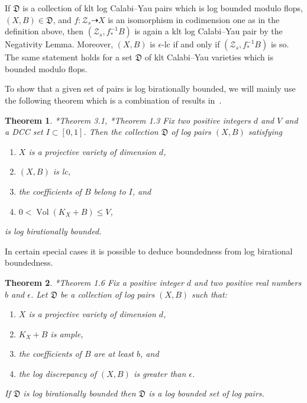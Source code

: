 \documentclass[11pt]{ip-journal}
\newtheorem{theorem}{Theorem}[section]
\theoremstyle{definition}
\DeclareMathOperator{\Vol}{\mathrm{Vol}}
\begin{document}
If $\mathfrak{D}$ is a collection of klt log Calabi--Yau pairs which is log bounded modulo flops, $(X, B)\in \mathfrak{D}$, and $f \colon \mathcal{Z}_s \dashrightarrow X$ is an isomorphism in codimension one as in the definition above, then $(\mathcal{Z}_s, f_*^{-1}B)$ is again a klt log Calabi--Yau pair by the Negativity Lemma.  
Moreover,  $(X, B)$ is $\epsilon$-lc if and only if $(\mathcal{Z}_s, f_*^{-1}B)$ is so. 
The same statement holds for a set $\mathfrak{D}$ of klt Calabi--Yau varieties which is bounded modulo flops.

To show that a given set of pairs is log birationally bounded, we will mainly use the following theorem which is a combination of results in~\cites{MR3034294, MR3224718}. 


\begin{theorem} 
\cite{MR3034294}*{Theorem 3.1}, 
\cite{MR3224718}*{Theorem 1.3} 
\label{main.hmx}
Fix two positive integers $d$ and $V$ and a DCC set $I\subset [0,1]$.
Then the collection $\mathfrak D$ of log pairs $(X,B)$ satisfying
	\begin{enumerate}
		\item $X$ is a projective variety of dimension $d$,
		\item $(X, B)$ is lc, 
		\item the coefficients of $B$ belong to $I$, and
		\item $0<\Vol(K_X+B)\leq V$,
	\end{enumerate}
	is log birationally bounded.
\end{theorem}

In certain special cases it is possible to deduce boundedness from log birational boundedness. 
\begin{theorem}
\cite{MR3224718}*{Theorem 1.6}
\label{hmx_1.6}
	Fix a positive integer $d$ and two positive real numbers $b$ and $\epsilon$. 
	Let $\mathfrak{D}$ be a collection of log pairs $(X,B)$ 
	such that: 
	\begin{enumerate}
		\item $X$ is a projective variety of dimension $d$,
		\item $K_{X}+B$ is ample,  
		\item the coefficients of $B$ are at least $b$, and
		\item the log discrepancy of $(X,B)$ is greater than $\epsilon$.
	\end{enumerate} 
	If $\mathfrak{D}$ is log birationally bounded then $\mathfrak{D}$ is a log bounded set of log pairs.
\end{theorem}
\end{document}
